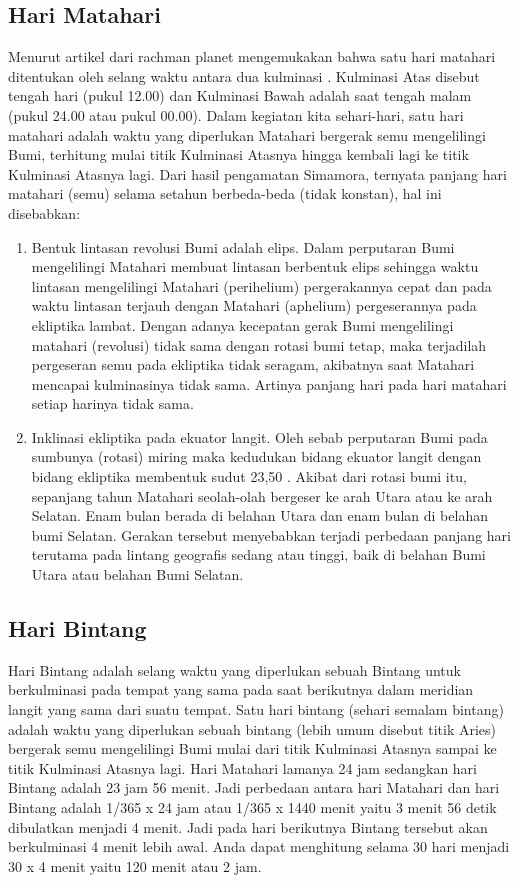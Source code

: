 \subsection{Hari Matahari}
 Menurut artikel dari rachman planet mengemukakan bahwa satu hari matahari ditentukan
 oleh selang waktu antara dua kulminasi \cite{rachmanplanet}. Kulminasi Atas disebut tengah hari (pukul 12.00)
 dan Kulminasi Bawah adalah saat tengah malam (pukul 24.00 atau pukul 00.00). 
 Dalam kegiatan kita sehari-hari, satu hari matahari adalah waktu yang diperlukan
 Matahari bergerak semu mengelilingi Bumi, terhitung mulai titik Kulminasi Atasnya
 hingga kembali lagi ke titik Kulminasi Atasnya lagi. Dari hasil pengamatan Simamora, ternyata 
 panjang hari matahari (semu) selama setahun berbeda-beda (tidak konstan), 
 hal ini disebabkan:
 \begin{enumerate}
 \item Bentuk lintasan revolusi Bumi adalah elips.
 Dalam perputaran Bumi mengelilingi Matahari membuat lintasan berbentuk elips 
 sehingga waktu lintasan mengelilingi Matahari (perihelium) 
 pergerakannya cepat dan pada waktu lintasan terjauh 
 dengan Matahari (aphelium) pergeserannya pada ekliptika lambat. 
 Dengan adanya kecepatan gerak Bumi mengelilingi matahari (revolusi)
 tidak sama dengan rotasi bumi tetap, maka terjadilah pergeseran semu
 pada ekliptika tidak seragam, akibatnya saat Matahari mencapai 
 kulminasinya tidak sama. Artinya panjang hari pada hari matahari 
 setiap harinya tidak sama.
 
 \item	Inklinasi ekliptika pada ekuator langit.
 Oleh sebab perputaran Bumi pada sumbunya (rotasi) miring maka kedudukan
 bidang ekuator langit dengan bidang ekliptika membentuk sudut 23,50 .
 Akibat dari rotasi bumi itu, sepanjang tahun Matahari seolah-olah bergeser ke arah
 Utara atau ke arah Selatan. Enam bulan berada di belahan Utara dan 
 enam bulan di belahan bumi Selatan. Gerakan tersebut menyebabkan 
 terjadi perbedaan panjang hari terutama pada lintang geografis sedang
 atau tinggi, baik di belahan Bumi Utara atau belahan Bumi Selatan.
 \end{enumerate}
\subsection{Hari Bintang}
Hari Bintang adalah selang waktu yang diperlukan sebuah Bintang untuk berkulminasi 
 pada tempat yang sama pada saat berikutnya dalam meridian langit yang 
 sama dari suatu tempat. Satu hari bintang (sehari semalam bintang) adalah 
 waktu yang diperlukan sebuah bintang (lebih umum disebut titik Aries) bergerak semu
 mengelilingi Bumi mulai dari titik Kulminasi Atasnya sampai ke titik Kulminasi Atasnya 
 lagi. Hari Matahari lamanya 24 jam sedangkan hari Bintang adalah 23 jam 56 menit. 
 Jadi perbedaan antara hari Matahari dan  hari Bintang adalah 1/365 x 24 jam atau 
 1/365 x 1440 menit yaitu 3 menit 56 detik  dibulatkan menjadi 4 menit. 
 Jadi pada hari berikutnya Bintang tersebut akan  berkulminasi 4 menit lebih awal.
 Anda dapat menghitung selama 30 hari menjadi  30 x 4 menit yaitu 120 menit atau 2 jam. 

